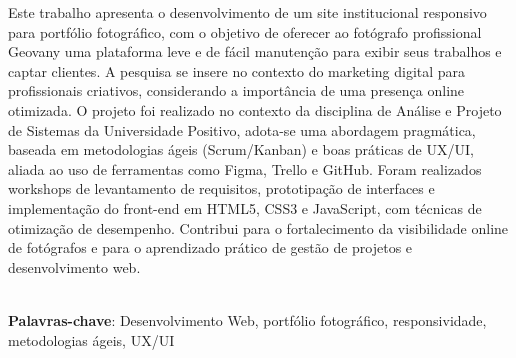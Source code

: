 \begin{thesisresumo}
Este trabalho apresenta o desenvolvimento de um site institucional responsivo para portfólio fotográfico, com o objetivo de oferecer ao fotógrafo profissional Geovany uma plataforma leve e de fácil manutenção para exibir seus trabalhos e captar clientes. A pesquisa se insere no contexto do marketing digital para profissionais criativos, considerando a importância de uma presença online otimizada. O projeto foi realizado no contexto da disciplina de Análise e Projeto de Sistemas da Universidade Positivo, adota-se uma abordagem pragmática, baseada em metodologias ágeis (Scrum/Kanban) e boas práticas de UX/UI, aliada ao uso de ferramentas como Figma, Trello e GitHub. Foram realizados workshops de levantamento de requisitos, prototipação de interfaces e implementação do front-end em HTML5, CSS3 e JavaScript, com técnicas de otimização de desempenho. Contribui para o fortalecimento da visibilidade online de fotógrafos e para o aprendizado prático de gestão de projetos e desenvolvimento web.

\ \\


\textbf{Palavras-chave}: Desenvolvimento Web, portfólio fotográfico, responsividade, metodologias ágeis, UX/UI

\end{thesisresumo}
